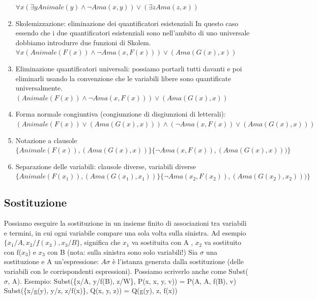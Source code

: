 \documentclass{article}
\begin{document}
\begin{enumerate}
    $\forall x (\exists y Animale(y) \land \neg Ama(x,y)) \lor (\exists z Ama(z, x))$
    \item Skolemizzazione: eliminazione dei quantificatori esistenziali \newline
    In questo caso essendo che i due quantificatori esistenziali sono nell'ambito di uno universale dobbiamo introdurre due funzioni di Skolem. \newline
    $\forall x (Animale(F(x)) \land \neg Ama(x,F(x))) \lor (Ama(G(x), x))$
    \item Eliminazione quantificatori universali: possiamo portarli tutti davanti e poi eliminarli usando la convenzione che le variabili libere sono quantificate universalmente. \newline
    $(Animale(F(x)) \land \neg Ama(x,F(x))) \lor (Ama(G(x), x))$
    \item Forma normale congiuntiva (congiunzione di disgiunzioni di letterali): \newline
    $(Animale(F(x)) \lor (Ama(G(x), x))) \land (\neg Ama(x,F(x)) \lor (Ama(G(x), x)))$
    \item Notazione a clausole \newline
    $\{Animale(F(x)),(Ama(G(x), x))\} \{\neg Ama(x,F(x)),(Ama(G(x), x)))\}$
    \item Separazione delle variabili: clausole diverse, variabili diverse \newline
    $\{Animale(F(x_1)),(Ama(G(x_1), x_1))\} \{\neg Ama(x_2,F(x_2)),(Ama(G(x_2), x_2)))\}$
\end{enumerate}

\subsection{Sostituzione}
Possiamo eseguire la sostituzione in un insieme finito di associazioni tra variabili e termini, in cui ogni variabile compare una sola volta sulla sinistra. Ad esempio $\{x_1/A, x_2/f(x_3), x_3/B\}$, significa che $x_1$ va sostituita con A , $x_2$ va sostituito con f($x_3$) e $x_3$ con B (nota: sulla sinistra sono solo variabili!)\newline
Sia $\sigma$ una sostituzione e A un'espressione: $A \sigma$ è l'istanza generata dalla sostituzione (delle variabili con le corrispondenti espressioni). Possiamo scriverlo anche come Subst($\sigma$, A). Esempio: \newline
Subst(\{x/A, y/f(B), z/W\}, P(x, x, y, v)) = P(A, A, f(B), v) \newline
Subst(\{x/g(y), y/z, z/f(x)\}, Q(x, y, z)) = Q(g(y), z, f(x))
\end{document}
